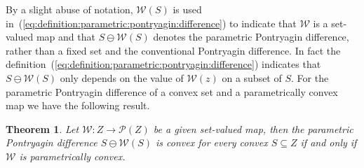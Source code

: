 \documentclass{elsarticle}
\newcounter{thmcount}
\newtheorem{thm}[thmcount]{Theorem}
\theoremstyle{remark}
\theoremstyle{definition}
\begin{document}
%
By a slight abuse of notation, $\mathcal{W}(S)$ is used in~(\ref{eq:definition:parametric:pontryagin:difference}) to indicate that $\mathcal{W}$ is a set-valued map and that $S\ominus\mathcal{W}(S)$ denotes the parametric Pontryagin difference, rather than a fixed set and the conventional Pontryagin difference. 
%
In fact the definition~(\ref{eq:definition:parametric:pontryagin:difference}) indicates that $S\ominus \mathcal{W}(S)$ only depends on the value of $\mathcal{W}(z)$ on a subset of $S$. 
%
%
For the parametric Pontryagin difference of a convex set and a parametrically convex map we 
have the following result.
%
\begin{thm}\label{thm:convexity:of:pontryagin:difference}
Let $\mathcal W: Z\rightarrow\mathscr P(Z)$ be a given set-valued map, then the parametric Pontryagin difference $S \ominus \mathcal W(S)$ is convex for every convex $S\subseteq Z$ if and only if $\mathcal W$ is parametrically convex.
\end{thm}
%
\end{document}
